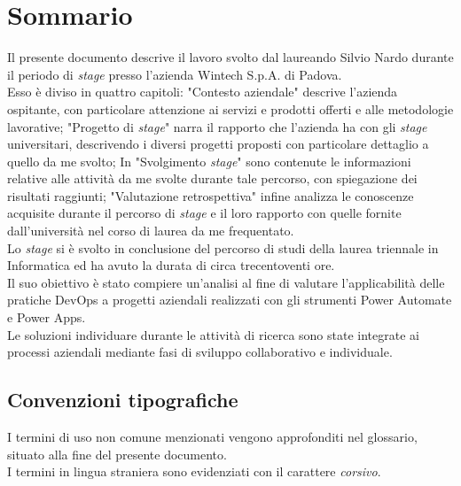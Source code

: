 \cleardoublepage
{}
{}
\begingroup
\let\clearpage\relax
\let\cleardoublepage\relax
\let\cleardoublepage\relax

\chapter*{Sommario}

Il presente documento descrive il lavoro svolto dal laureando Silvio Nardo durante il periodo di \emph{stage} presso l'azienda Wintech S.p.A. di Padova.\\
Esso è diviso in quattro capitoli: "Contesto aziendale" descrive l'azienda ospitante, con particolare attenzione ai servizi e prodotti offerti e alle metodologie lavorative; "Progetto di \emph{stage}" narra il rapporto che l'azienda ha con gli \emph{stage} universitari, descrivendo i diversi progetti proposti con particolare dettaglio a quello da me svolto; In "Svolgimento \emph{stage}" sono contenute le informazioni relative alle attività da me svolte durante tale percorso, con spiegazione dei risultati raggiunti; "Valutazione retrospettiva" infine analizza le conoscenze acquisite durante il percorso di \emph{stage} e il loro rapporto con quelle fornite dall'università nel corso di laurea da me frequentato.\\
Lo \emph{stage} si è svolto in conclusione del percorso di studi della laurea triennale in Informatica ed ha avuto la durata di circa trecentoventi ore.\\
Il suo obiettivo è stato compiere un'analisi al fine di valutare l'applicabilità delle pratiche DevOps a progetti aziendali realizzati con gli strumenti Power Automate e Power Apps.\\
Le soluzioni individuare durante le attività di ricerca sono state integrate ai processi aziendali mediante fasi di sviluppo collaborativo e individuale.

\section*{Convenzioni tipografiche}
I termini di uso non comune menzionati vengono approfonditi nel glossario, situato alla fine del presente documento.\\
I termini in lingua straniera sono evidenziati con il carattere \emph{corsivo}.





\endgroup

\vfill
